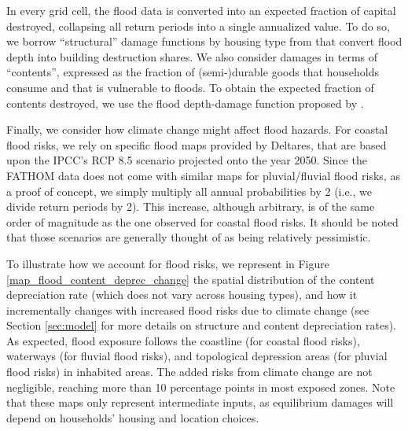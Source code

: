 \documentclass[12pt]{article}
\begin{document}
In every grid cell, the flood data is converted into an expected fraction of capital destroyed, collapsing all return periods into a single annualized value. To do so, we borrow ``structural'' damage functions by housing type from \citet{Englhardt2019EnhancementAreas} that convert flood depth into building destruction shares. We also consider damages in terms of ``contents'', expressed as the fraction of (semi-)durable goods that households consume and that is vulnerable to floods. To obtain the expected fraction of contents destroyed, we use the flood depth-damage function proposed by \citet{DeVilliers2007StandardConditions}.


Finally, we consider how climate change might affect flood hazards. For coastal flood risks, we rely on specific flood maps provided by Deltares, that are based upon the IPCC’s RCP 8.5 scenario projected onto the year 2050. Since the FATHOM data does not come with similar maps for pluvial/fluvial flood risks, as a proof of concept, we simply multiply all annual probabilities by 2 (i.e., we divide return periods by 2). This increase, although arbitrary, is of the same order of magnitude as the one observed for coastal flood risks. It should be noted that those scenarios are generally thought of as being relatively pessimistic.

To illustrate how we account for flood risks, we represent in Figure \ref{map_flood_content_deprec_change} the spatial distribution of the content depreciation rate (which does not vary across housing types), and how it incrementally changes  with increased flood risks due to climate change (see Section \ref{sec:model} for more details on structure and content depreciation rates). As expected, flood exposure follows the coastline (for coastal flood risks), waterways (for fluvial flood risks), and topological depression areas (for pluvial flood risks) in inhabited areas. The added risks from climate change are not negligible, reaching more than 10 percentage points in most exposed zones. Note that these maps only represent intermediate inputs, as equilibrium damages will depend on households' housing and location choices.
\end{document}
